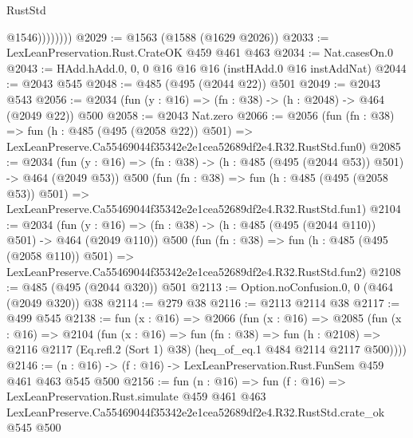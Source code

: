 \begin{lexlean}{RustStd}
\begin{coremodule}
                    @1546))))))))
@2029 := @1563 (@1588 (@1629 @2026))
@2033 := LexLeanPreservation.Rust.CrateOK @459 @461 @463
@2034 := Nat.casesOn.{0}
@2043 := HAdd.hAdd.{0, 0, 0} @16 @16 @16 (instHAdd.{0} @16 instAddNat)
@2044 := @2043 @545
@2048 := @485 (@495 (@2044 @22)) @501
@2049 := @2043 @543
@2056 := @2034 (fun (y : @16) => (fn : @38) -> (h : @2048) -> @464 (@2049 @22)) @500
@2058 := @2043 Nat.zero
@2066 := @2056
    (fun (fn : @38) =>
    fun (h : @485 (@495 (@2058 @22)) @501) =>
    LexLeanPreserve.Ca55469044f35342e2e1cea52689df2e4.R32.RustStd.fun0)
@2085 := @2034
    (fun (y : @16) => (fn : @38) -> (h : @485 (@495 (@2044 @53)) @501) -> @464 (@2049 @53))
    @500
    (fun (fn : @38) =>
    fun (h : @485 (@495 (@2058 @53)) @501) =>
    LexLeanPreserve.Ca55469044f35342e2e1cea52689df2e4.R32.RustStd.fun1)
@2104 := @2034
    (fun (y : @16) => (fn : @38) -> (h : @485 (@495 (@2044 @110)) @501) -> @464 (@2049 @110))
    @500
    (fun (fn : @38) =>
    fun (h : @485 (@495 (@2058 @110)) @501) =>
    LexLeanPreserve.Ca55469044f35342e2e1cea52689df2e4.R32.RustStd.fun2)
@2108 := @485 (@495 (@2044 @320)) @501
@2113 := Option.noConfusion.{0, 0} (@464 (@2049 @320)) @38
@2114 := @279 @38
@2116 := @2113 @2114 @38
@2117 := @499 @545
@2138 := fun (x : @16) =>
  @2066
    (fun (x : @16) =>
    @2085
      (fun (x : @16) =>
      @2104
        (fun (x : @16) =>
        fun (fn : @38) =>
        fun (h : @2108) =>
        @2116 @2117 (Eq.refl.{2} (Sort 1) @38) (heq_of_eq.{1} @484 @2114 @2117 @500))))
@2146 := (n : @16) -> (f : @16) -> LexLeanPreservation.Rust.FunSem @459 @461 @463 @545 @500
@2156 := fun (n : @16) =>
  fun (f : @16) =>
  LexLeanPreservation.Rust.simulate
    @459
    @461
    @463
    LexLeanPreserve.Ca55469044f35342e2e1cea52689df2e4.R32.RustStd.crate_ok
    @545
    @500
\end{coremodule}
\end{lexlean}
